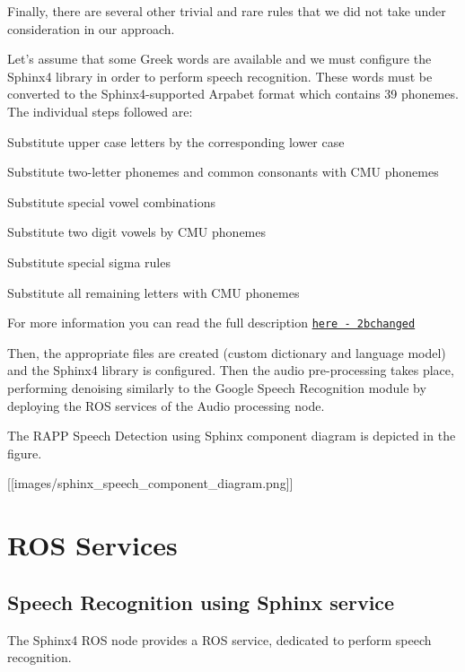 Finally, there are several other trivial and rare rules that we did not take under consideration in our approach.

Let’s assume that some Greek words are available and we must configure the Sphinx4 library in order to perform speech recognition. These words must be converted to the Sphinx4-\/supported Arpabet format which contains 39 phonemes. The individual steps followed are\-:


\begin{DoxyItemize}
\item Substitute upper case letters by the corresponding lower case
\item Substitute two-\/letter phonemes and common consonants with C\-M\-U phonemes
\item Substitute special vowel combinations
\item Substitute two digit vowels by C\-M\-U phonemes
\item Substitute special sigma rules
\item Substitute all remaining letters with C\-M\-U phonemes
\end{DoxyItemize}

For more information you can read the full description \href{http://rapp-project.eu/wp-content/uploads/2015/03/RAPP_D2.1.1_V1.0_13032015.pdf}{\tt here -\/ 2bchanged}

Then, the appropriate files are created (custom dictionary and language model) and the Sphinx4 library is configured. Then the audio pre-\/processing takes place, performing denoising similarly to the Google Speech Recognition module by deploying the R\-O\-S services of the Audio processing node.

The R\-A\-P\-P Speech Detection using Sphinx component diagram is depicted in the figure.

\mbox{[}\mbox{[}images/sphinx\-\_\-speech\-\_\-component\-\_\-diagram.\-png\mbox{]}\mbox{]}

\section*{R\-O\-S Services}

\subsection*{Speech Recognition using Sphinx service}

The Sphinx4 R\-O\-S node provides a R\-O\-S service, dedicated to perform speech recognition.

